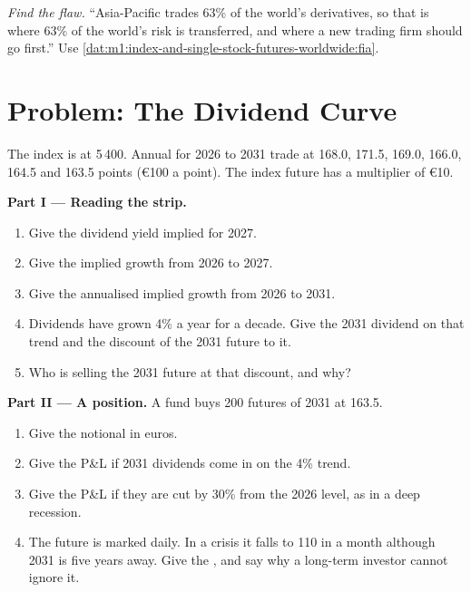 \begin{exercise}[$\star\star\star$]\label{exo:m1:index-and-single-stock-futures-worldwide:8}
\emph{Find the flaw.} ``Asia-Pacific trades 63\% of the world's derivatives,
so that is where 63\% of the world's risk is transferred, and where a new
trading firm should go first.'' Use
\cref{dat:m1:index-and-single-stock-futures-worldwide:fia}.
\end{exercise}

\section{Problem: The Dividend Curve}

\begin{problem}\label{pb:m1:index-and-single-stock-futures-worldwide:1}
The index is at 5\,400. Annual  for 2026 to 2031 trade at
168.0, 171.5, 169.0, 166.0, 164.5 and 163.5 points (\euro100 a point). The
index future has a multiplier of \euro10.

\medskip\noindent\textbf{Part I --- Reading the strip.}
\begin{enumerate}
\item Give the dividend yield implied for 2027.
\item Give the implied growth from 2026 to 2027.
\item Give the annualised implied growth from 2026 to 2031.
\item Dividends have grown 4\% a year for a decade. Give the 2031 dividend on
that trend and the discount of the 2031 future to it.
\item Who is selling the 2031 future at that discount, and why?
\end{enumerate}

\medskip\noindent\textbf{Part II --- A position.}
A fund buys 200 futures of 2031 at 163.5.
\begin{enumerate}[resume]
\item Give the notional in euros.
\item Give the P\&L if 2031 dividends come in on the 4\% trend.
\item Give the P\&L if they are cut by 30\% from the 2026 level, as in a deep
recession.
\item The future is marked daily. In a crisis it falls to 110 in a month
although 2031 is five years away. Give the , and say why a
long-term investor cannot ignore it.
\end{enumerate}


\end{problem}

